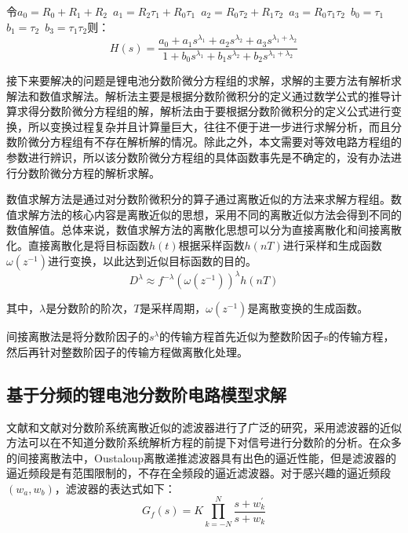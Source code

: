 令${{a}_{0}}={{R}_{0}}+{{R}_{1}}+{{R}_{2}}$~${{a}_{1}}={{R}_{2}}{{\tau }_{1}}+{{R}_{0}}{{\tau }_{1}}$~${{a}_{2}}={{R}_{0}}{{\tau }_{2}}+{{R}_{1}}{{\tau }_{2}}$~${{a}_{3}}={{R}_{0}}{{\tau }_{1}}{{\tau }_{2}}$~${{b}_{0}}={{\tau }_{1}}$~${{b}_{1}}={{\tau }_{2}}$~${{b}_{3}}={{\tau }_{1}}{{\tau }_{2}}$则：
\begin{equation}
H\left( s \right)=\frac{{{a}_{0}}+{{a}_{1}}{{s}^{{{\lambda }_{1}}}}+{{a}_{2}}{{s}^{{{\lambda }_{2}}}}+{{a}_{3}}{{s}^{{{\lambda }_{1}}+{{\lambda }_{2}}}}}{1+{{b}_{0}}{{s}^{{{\lambda }_{1}}}}+{{b}_{1}}{{s}^{{{\lambda }_{2}}}}+{{b}_{2}}{{s}^{{{\lambda }_{1}}+{{\lambda }_{2}}}}}
\end{equation}

接下来要解决的问题是锂电池分数阶微分方程组的求解，求解的主要方法有解析求解法和数值求解法。解析法主要是根据分数阶微积分的定义通过数学公式的推导计算求得分数阶微分方程组的解，解析法由于要根据分数阶微积分的定义公式进行变换，所以变换过程复杂并且计算量巨大，往往不便于进一步进行求解分析，而且分数阶微分方程组有不存在解析解的情况。除此之外，本文需要对等效电路方程组的参数进行辨识，所以该分数阶微分方程组的具体函数事先是不确定的，没有办法进行分数阶微分方程的解析求解。

数值求解方法是通过对分数阶微积分的算子通过离散近似的方法来求解方程组。数值求解方法的核心内容是离散近似的思想，采用不同的离散近似方法会得到不同的数值解值。总体来说，数值求解方法的离散化思想可以分为直接离散化和间接离散化。直接离散化是将目标函数$h\left( t \right)$根据采样函数$h\left( nT \right)$进行采样和生成函数$\omega \left( {{z}^{-1}} \right)$进行变换，以此达到近似目标函数的目的。
\begin{equation}
{{D}^{\lambda }}\approx {{f}^{-\lambda }}{{\left( \omega \left( {{z}^{-1}} \right) \right)}^{\lambda }}h\left( nT \right)
\end{equation}

其中，$\lambda $是分数阶的阶次，$T$是采样周期，$\omega \left( {{z}^{-1}} \right)$是离散变换的生成函数。

间接离散法是将分数阶因子的${{s}^{\lambda }}$的传输方程首先近似为整数阶因子s的传输方程，然后再针对整数阶因子的传输方程做离散化处理。
\subsection{基于分频的锂电池分数阶电路模型求解}
文献和文献对分数阶系统离散近似的滤波器进行了广泛的研究，采用滤波器的近似方法可以在不知道分数阶系统解析方程的前提下对信号进行分数阶的分析。在众多的间接离散法中，Oustaloup离散递推滤波器具有出色的逼近性能，但是滤波器的逼近频段是有范围限制的，不存在全频段的逼近滤波器。对于感兴趣的逼近频段$\left( {{w}_{a}},{{w}_{b}} \right)$，滤波器的表达式如下：
\begin{equation}
{{G}_{f}}\left( s \right)=K\prod\limits_{k=-N}^{N}{\frac{s+w_{k}^{'}}{s+{{w}_{k}}}}
\end{equation}

